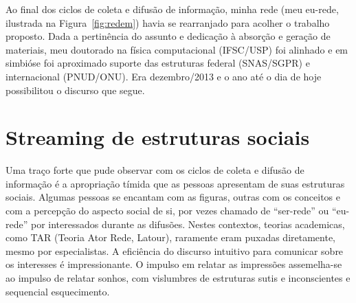 \documentclass[a4paper, 11pt]{article} %
\begin{document}
Ao final dos ciclos de coleta e difusão de informação, minha rede (meu eu-rede, ilustrada na Figura~\ref{fig:redem}) havia se rearranjado para acolher o trabalho proposto. Dada a pertinência do assunto e dedicação à absorção e geração de materiais, meu doutorado na física computacional (IFSC/USP) foi alinhado e em simbióse foi aproximado suporte das estruturas federal (SNAS/SGPR) e internacional (PNUD/ONU). Era dezembro/2013 e o ano até o dia de hoje possibilitou o discurso que segue.



\section*{Streaming de estruturas sociais}


Uma traço forte que pude observar com os ciclos de coleta e difusão de informação é a apropriação tímida que as pessoas apresentam de suas estruturas sociais. Algumas pessoas se encantam com as figuras, outras com os conceitos e com a percepção do aspecto social de si, por vezes chamado de ``ser-rede'' ou ``eu-rede'' por interessados durante as difusões. Nestes contextos, teorias academicas, como TAR (Teoria Ator Rede, Latour), raramente eram puxadas diretamente, mesmo por especialistas. A eficiência do discurso intuitivo para comunicar sobre os interesses é impressionante. O impulso em relatar as impressões assemelha-se ao impulso de relatar sonhos, com vislumbres de estruturas sutis e inconscientes e sequencial esquecimento.
\end{document}
